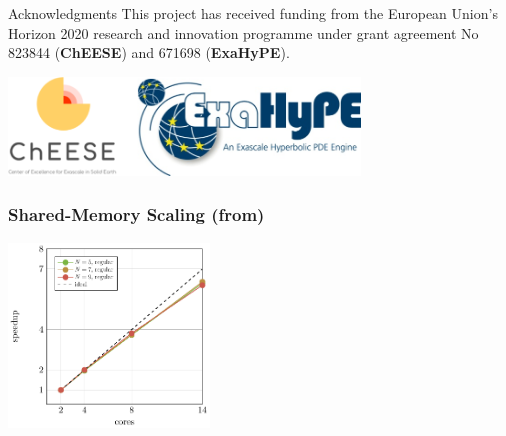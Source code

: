 \documentclass[aspectratio=169]{beamer}
\begin{document}
\begin{frame}{Acknowledgments}
This project has received funding from the European Union's Horizon 2020 research and
innovation programme under grant agreement No 823844 (\textbf{ChEESE}) and 671698 (\textbf{ExaHyPE}).

\begin{center}
\includegraphics[width=0.7\textwidth]{logos}
\end{center}
\end{frame}

\begin{frame}
  \frametitle{Shared-Memory Scaling (from)}
  \begin{center}
  \includegraphics[width=0.4\textwidth]{speedup_tbb}
  \end{center}
  
\end{frame}
\end{document}
